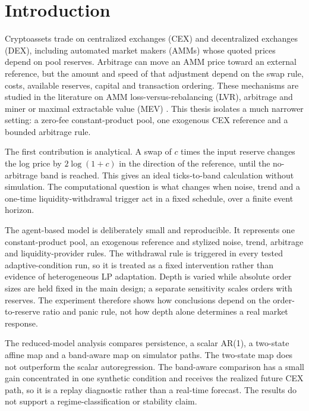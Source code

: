\chapter{Introduction}
\label{cap:introduccion}

Cryptoassets trade on centralized exchanges (CEX) and decentralized exchanges (DEX), including automated market makers (AMMs) whose quoted prices depend on pool reserves. Arbitrage can move an AMM price toward an external reference, but the amount and speed of that adjustment depend on the swap rule, costs, available reserves, capital and transaction ordering. These mechanisms are studied in the literature on AMM loss-versus-rebalancing (LVR), arbitrage and miner or maximal extractable value (MEV) \cite{milionis2022lvr,daian2020flash,zhou2021hft}. This thesis isolates a much narrower setting: a zero-fee constant-product pool, one exogenous CEX reference and a bounded arbitrage rule.

The first contribution is analytical. A swap of $c$ times the input reserve changes the log price by $2\log(1+c)$ in the direction of the reference, until the no-arbitrage band is reached. This gives an ideal ticks-to-band calculation without simulation. The computational question is what changes when noise, trend and a one-time liquidity-withdrawal trigger act in a fixed schedule, over a finite event horizon.

The agent-based model is deliberately small and reproducible. It represents one constant-product pool, an exogenous reference and stylized noise, trend, arbitrage and liquidity-provider rules. The withdrawal rule is triggered in every tested adaptive-condition run, so it is treated as a fixed intervention rather than evidence of heterogeneous LP adaptation. Depth is varied while absolute order sizes are held fixed in the main design; a separate sensitivity scales orders with reserves. The experiment therefore shows how conclusions depend on the order-to-reserve ratio and panic rule, not how depth alone determines a real market response.

The reduced-model analysis compares persistence, a scalar AR(1), a two-state affine map and a band-aware map on simulator paths. The two-state map does not outperform the scalar autoregression. The band-aware comparison has a small gain concentrated in one synthetic condition and receives the realized future CEX path, so it is a replay diagnostic rather than a real-time forecast. The results do not support a regime-classification or stability claim.

